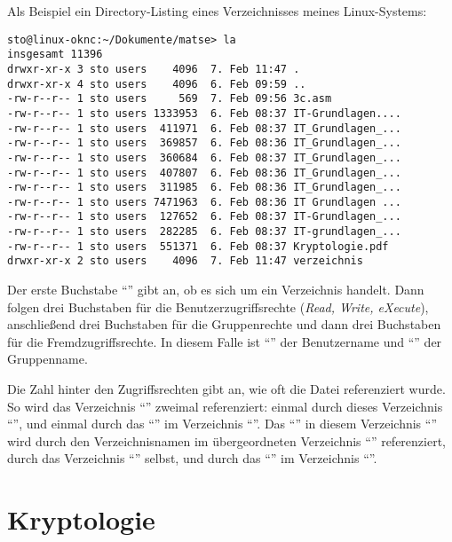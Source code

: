 \begin{minipage}[t]{1\columnwidth}%
Als Beispiel ein \foreignlanguage{english}{Directory-Listing} eines Verzeichnisses meines Linux-Systems:
\footnotesize\begin{verbatim}
sto@linux-oknc:~/Dokumente/matse> la
insgesamt 11396
drwxr-xr-x 3 sto users    4096  7. Feb 11:47 .
drwxr-xr-x 4 sto users    4096  6. Feb 09:59 ..
-rw-r--r-- 1 sto users     569  7. Feb 09:56 3c.asm
-rw-r--r-- 1 sto users 1333953  6. Feb 08:37 IT-Grundlagen....
-rw-r--r-- 1 sto users  411971  6. Feb 08:37 IT_Grundlagen_...
-rw-r--r-- 1 sto users  369857  6. Feb 08:36 IT_Grundlagen_...
-rw-r--r-- 1 sto users  360684  6. Feb 08:37 IT_Grundlagen_...
-rw-r--r-- 1 sto users  407807  6. Feb 08:36 IT_Grundlagen_...
-rw-r--r-- 1 sto users  311985  6. Feb 08:36 IT_Grundlagen_...
-rw-r--r-- 1 sto users 7471963  6. Feb 08:36 IT Grundlagen ...
-rw-r--r-- 1 sto users  127652  6. Feb 08:37 IT-Grundlagen_...
-rw-r--r-- 1 sto users  282285  6. Feb 08:37 IT-grundlagen_...
-rw-r--r-- 1 sto users  551371  6. Feb 08:37 Kryptologie.pdf
drwxr-xr-x 2 sto users    4096  7. Feb 11:47 verzeichnis
\end{verbatim}
\medskip
\end{minipage}

Der erste Buchstabe \enquote{} gibt an, ob es sich um ein Verzeichnis handelt.
Dann folgen drei Buchstaben für die Benutzerzugriffsrechte (\foreignlanguage{english}{\emph{Read, Write, eXecute}}), anschließend drei Buchstaben für die Gruppenrechte und dann drei Buchstaben für die Fremdzugriffsrechte.
In diesem Falle ist \enquote{} der Benutzername und \enquote{} der Gruppenname.

Die Zahl hinter den Zugriffsrechten gibt an, wie oft die Datei referenziert wurde.
So wird das Verzeichnis \enquote{} zweimal referenziert: einmal durch dieses Verzeichnis \enquote{}, und einmal durch das \enquote{} im Verzeichnis \enquote{}.
Das \enquote{} in diesem Verzeichnis \enquote{} wird durch den Verzeichnisnamen im übergeordneten Verzeichnis \enquote{} referenziert, durch das Verzeichnis \enquote{} selbst, und durch das \enquote{} im Verzeichnis \enquote{}.


\chapter{Kryptologie}


